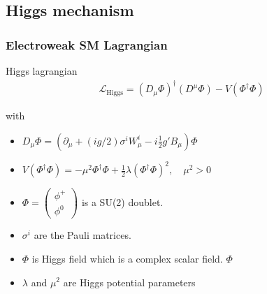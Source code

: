 \documentclass[11pt]{beamer}
\begin{document}
\begin{frame}
\subsection{Higgs mechanism}
\frametitle{Electroweak SM Lagrangian}
Higgs lagrangian 
\begin{align}
\mathcal{L}_{\text{Higgs}}=(D_\mu \Phi)^\dagger (D^\mu \Phi)-V(\Phi^\dagger \Phi)
\end{align}

with
\begin{itemize}
	\item $D_\mu \Phi = \left(\partial_\mu+(ig/2)\sigma^iW^i_\mu-i\frac{1}{2} g' B_\mu \right) \Phi $
	\item $V(\Phi^\dagger \Phi)=-\mu^2 \Phi^\dagger \Phi +\frac{1}{2}  \lambda (\Phi^\dagger \Phi)^2, \quad \mu^2>0  $ 
	\item $\Phi=\left(\begin{array}{c}
	\phi^+ \\
	\phi^0
	\end{array} \right)  $ is a SU(2) doublet.
	\item $\sigma^i$ are the Pauli matrices.
\end{itemize}
 
\begin{itemize}
	\item $\Phi$ is Higgs field which is a complex scalar field. $\Phi$
	\item $\lambda $ and $\mu^2$ are Higgs potential parameters
\end{itemize}
\end{frame}
\end{document}
